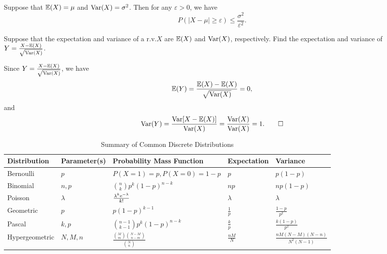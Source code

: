 \begin{theorem}
  Suppose that \(\mathbb{E}(X) = \mu\) and \(\mathrm{Var}(X) = \sigma^2\). Then for any \(\varepsilon > 0\), we have
  \[
    P(|X - \mu| \geq \varepsilon) \leq \frac{\sigma^2}{\varepsilon^2}.
  \]
\end{theorem}

\begin{example}[Standarization]
  Suppose that the expectation and variance of a r.v.\@ \(X\) are \(\mathbb{E}(X)\) and \(\mathrm{Var}(X)\), respectively. Find the expectation and variance of \(Y = \frac{X - \mathbb{E}(X)}{\sqrt{\mathrm{Var}(X)}}\).
\end{example}
\begin{solution}
  Since \(Y = \frac{X - \mathbb{E}(X)}{\sqrt{\mathrm{Var}(X)}}\), we have
  \[
    \mathbb{E}(Y) = \frac{\mathbb{E}(X) - \mathbb{E}(X)}{\sqrt{\mathrm{Var}(X)}} = 0,
  \]
  and
  \[
    \mathrm{Var}(Y) = \frac{\mathrm{Var}[X - \mathbb{E}(X)]}{\mathrm{Var}(X)} = \frac{\mathrm{Var}(X)}{\mathrm{Var}(X)} = 1. \qedhere
  \]
\end{solution}

\begin{table}[tbp]
  \centering
  \caption{Summary of Common Discrete Distributions}
  \label{tab:common_distributions}
  \scriptsize
  \begin{tabular}{l l l l l}
    \toprule
    Distribution & Parameter(s) & Probability Mass Function & Expectation & Variance \\
    \midrule
    Bernoulli & $p$ & $P(X = 1) = p, P(X = 0) = 1 - p$ & $p$ & $p(1 - p)$ \\
    Binomial & $n, p$ & $\binom{n}{k} p^k (1 - p)^{n - k}$ & $np$ & $np(1 - p)$ \\
    Poisson & $\lambda$ & $\frac{\lambda^k \mathrm{e}^{-\lambda}}{k!}$ & $\lambda$ & $\lambda$ \\
    Geometric & $p$ & $p (1 - p)^{k - 1}$ & $\frac{1}{p}$ & $\frac{1 - p}{p^2}$ \\
    Pascal & $k, p$ & $\binom{n - 1}{k - 1} p^k (1 - p)^{n - k}$ & $\frac{k}{p}$ & $\frac{k(1 - p)}{p^2}$ \\
    Hypergeometric & $N, M, n$ & $\frac{\binom{M}{m} \binom{N - M}{n - m}}{\binom{N}{n}}$ & $\frac{nM}{N}$ & $\frac{nM(N - M)(N - n)}{N^2(N - 1)}$ \\
    \bottomrule
  \end{tabular}
\end{table}

